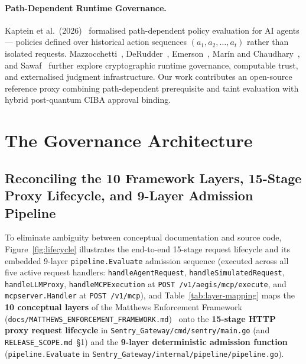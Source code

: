 \documentclass[11pt, a4paper]{article}
\begin{document}
\paragraph{Path-Dependent Runtime Governance.}
Kaptein et al.\ (2026)~\cite{kaptein2026} formalised path-dependent policy evaluation for AI agents --- policies defined over historical action sequences $(a_1, a_2, \dots, a_t)$ rather than isolated requests. Mazzocchetti~\cite{mazzocchetti2026}, DeRudder~\cite{derudder2026}, Emerson~\cite{emerson2026}, Mar\'{i}n and Chaudhary~\cite{marin2026}, and Sawaf~\cite{sawaf2026} further explore cryptographic runtime governance, computable trust, and externalised judgment infrastructure. Our work contributes an open-source reference proxy combining path-dependent prerequisite and taint evaluation with hybrid post-quantum CIBA approval binding.

\section{The Governance Architecture}
\label{sec:architecture}

\subsection{Reconciling the 10 Framework Layers, 15-Stage Proxy Lifecycle, and 9-Layer Admission Pipeline}
\label{subsec:reconciliation}

To eliminate ambiguity between conceptual documentation and source code, Figure~\ref{fig:lifecycle} illustrates the end-to-end 15-stage request lifecycle and its embedded 9-layer \texttt{pipeline.Evaluate} admission sequence (executed across all five active request handlers: \texttt{handleAgentRequest}, \texttt{handleSimulatedRequest}, \texttt{handleLLMProxy}, \texttt{handleMCPExecution} at \texttt{POST /v1/aegis/mcp/execute}, and \texttt{mcpserver.Handler} at \texttt{POST /v1/mcp}), and Table~\ref{tab:layer-mapping} maps the \textbf{10 conceptual layers} of the Matthews Enforcement Framework (\texttt{docs/MATTHEWS\_ENFORCEMENT\_FRAMEWORK.md})~\cite{mef2026} onto the \textbf{15-stage HTTP proxy request lifecycle} in \texttt{Sentry\_Gateway/cmd/sentry/main.go} (and \texttt{RELEASE\_SCOPE.md}~\S1) and the \textbf{9-layer deterministic admission function} (\texttt{pipeline.Evaluate} in \texttt{Sentry\_Gateway/internal/pipeline/pipeline.go}).
\end{document}
